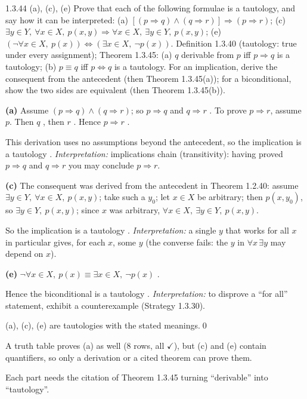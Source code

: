 \begin{bookex}[essential]{1.3.44 (a), (c), (e)}
Prove that each of the following formulae is a tautology, and say how it can be interpreted: (a) $[(p\Rightarrow q)\wedge(q\Rightarrow r)]\Rightarrow(p\Rightarrow r)$; (c) $\exists y\in Y,\ \forall x\in X,\ p(x,y)\Rightarrow\forall x\in X,\ \exists y\in Y,\ p(x,y)$; (e) $(\neg\forall x\in X,\ p(x))\Leftrightarrow(\exists x\in X,\ \neg p(x))$.
\solution
\given Definition 1.3.40 (tautology: true under every assignment); Theorem 1.3.45: (a) $q$ derivable from $p$ iff $p\Rightarrow q$ is a tautology; (b) $p\equiv q$ iff $p\Leftrightarrow q$ is a tautology.
\plan For an implication, derive the consequent from the antecedent (then Theorem 1.3.45(a)); for a biconditional, show the two sides are equivalent (then Theorem 1.3.45(b)).
\begin{steps}
\item \textbf{(a)} Assume $(p\Rightarrow q)\wedge(q\Rightarrow r)$; so $p\Rightarrow q$ and $q\Rightarrow r$ . To prove $p\Rightarrow r$, assume $p$. Then $q$ , then $r$ . Hence $p\Rightarrow r$ .
\item This derivation uses no assumptions beyond the antecedent, so the implication is a tautology . \emph{Interpretation:} implications chain (transitivity): having proved $p\Rightarrow q$ and $q\Rightarrow r$ you may conclude $p\Rightarrow r$.
\item \textbf{(c)} The consequent was derived from the antecedent in Theorem 1.2.40: assume $\exists y\in Y,\ \forall x\in X,\ p(x,y)$; take such a $y_0$; let $x\in X$ be arbitrary; then $p(x,y_0)$, so $\exists y\in Y,\ p(x,y)$; since $x$ was arbitrary, $\forall x\in X,\ \exists y\in Y,\ p(x,y)$.
\item So the implication is a tautology . \emph{Interpretation:} a single $y$ that works for all $x$ in particular gives, for each $x$, some $y$ (the converse fails: the $y$ in $\forall x\,\exists y$ may depend on $x$).
\item \textbf{(e)} $\neg\forall x\in X,\ p(x)\equiv\exists x\in X,\ \neg p(x)$ .
\item Hence the biconditional is a tautology . \emph{Interpretation:} to disprove a ``for all'' statement, exhibit a counterexample (Strategy 1.3.30).
\end{steps}
\conclusion (a), (c), (e) are tautologies with the stated meanings.\qed
\begin{compare}
\item A truth table proves (a) as well ($8$ rows, all $\checkmark$), but (c) and (e) contain quantifiers, so only a derivation or a cited theorem can prove them.
\item Each part needs the citation of Theorem 1.3.45 turning ``derivable'' into ``tautology''.
\end{compare}
\end{bookex}

